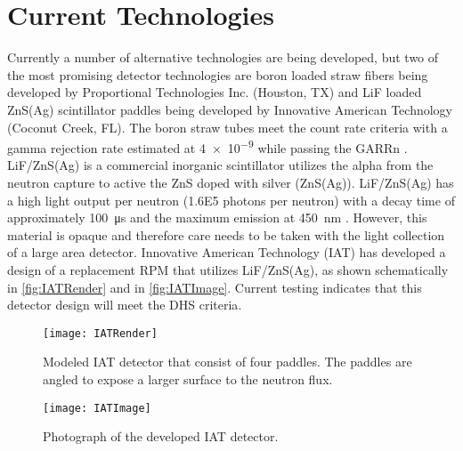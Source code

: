 \section{Current Technologies}
\label{sec:CurrentTechnologies}
Currently a number of alternative technologies are being developed, but two of the most promising detector technologies are boron loaded straw fibers being developed by Proportional Technologies Inc. (Houston, TX) and LiF loaded ZnS(Ag) scintillator paddles being developed by Innovative American Technology (Coconut Creek, FL).
The boron straw tubes meet the count rate criteria with a gamma rejection rate estimated at \num{4e-9} while passing the GARRn \cite{kouzes_boron-lined_2012}.
LiF/ZnS(Ag) is a commercial inorganic scintillator utilizes the alpha from the  neutron capture to active the ZnS doped with silver (ZnS(Ag)). 
LiF/ZnS(Ag) has a high light output per neutron (\num{1.6E5} photons per neutron) with a decay time of approximately \SI{100}{\micro\second} and the maximum emission at \SI{450}{\nm} \cite{carel_w.e_inorganic-scintillator_2001}.
However, this material is opaque and therefore care needs to be taken with the light collection of a large area detector.
Innovative American Technology (IAT) has developed a design of a replacement RPM that utilizes LiF/ZnS(Ag), as shown schematically in \autoref{fig:IATRender} and in \autoref{fig:IATImage}.
Current testing indicates that this detector design will meet the DHS criteria\cite{kouzes_lithium_2010}.
\begin{figure}
  \centering
  \texttt{[image: IATRender]}
	\caption[Rendering of IAT Neutron Detector]{Modeled IAT detector that consist of four paddles.  The paddles are angled to expose a larger surface to the neutron flux\cite{pnnl_22228}.}
	\label{fig:IATRender}
\end{figure}
\begin{figure}
  \centering
  \texttt{[image: IATImage]}
	\caption[Photograph of IAT Neutron Detector]{Photograph of the developed IAT detector\cite{pnnl_22228}.}
	\label{fig:IATImage}
\end{figure}

